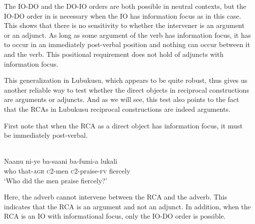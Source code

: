 \documentclass[output=paper]{langsci/langscibook}
\begin{document}
The IO-DO and the DO-IO orders are both possible in neutral contexts, but the IO-DO order in  is necessary when the IO has information focus as in this case. This shows that there is no sensitivity to whether the intervener is an argument or an adjunct. As long as some argument of the verb has information focus, it has to occur in an immediately post-verbal position and nothing can occur between it and the verb. This positional requirement does not hold of adjuncts with information focus.

This generalization in Lubukusu, which appears to be quite robust, thus gives us another reliable way to test whether the direct objects in reciprocal constructions are arguments or adjuncts. And as we will see, this test also points to the fact that the RCAs in Lubukusu reciprocal constructions are indeed  arguments.

First note that when the RCA as a direct object has information focus, it must be immediately post-verbal. 


\ea\label{ex:safir:18}
\settowidth{}
\\
\gll Naanu  ni-ye     ba-saani   ba-fumi-a   lukali\\
who   that-\textsc{agr}  \textsc{c}2-men   \textsc{c}2-praise-\textsc{fv}   fiercely\\
\glt ‘Who did the men praise fiercely?’
\z
\z


Here, the adverb cannot intervene between the RCA and the adverb. This indicates that the RCA is an argument and not an adjunct. In addition, when the RCA is an IO with informational focus, only the IO-DO order is possible.


\ea\label{ex:safir:19}
\settowidth{}
  \\
\z
\z
\end{document}
